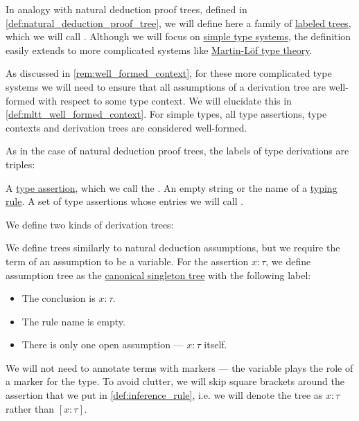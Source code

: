 \begin{definition}\label{def:type_derivation_tree}\mimprovised
  In analogy with natural deduction proof trees, defined in \cref{def:natural_deduction_proof_tree}, we will define here a family of \hyperref[def:labeled_tree]{labeled trees}, which we will call . Although we will focus on \hyperref[def:simple_type_system]{simple type systems}, the definition easily extends to more complicated systems like \hyperref[def:mltt]{Martin-L\"of type theory}.

  As discussed in \cref{rem:well_formed_context}, for these more complicated type systems we will need to ensure that all assumptions of a derivation tree are well-formed with respect to some type context. We will elucidate this in \cref{def:mltt_well_formed_context}. For simple types, all type assertions, type contexts and derivation trees are considered well-formed.

  As in the case of natural deduction proof trees, the labels of type derivations are triples:
  \begin{thmenum}[series=def:type_derivation_tree]
     A \hyperref[def:type_assertion]{type assertion}, which we call the .
     An empty string or the name of a \hyperref[def:simple_typing_rule]{typing rule}.
     A set of type assertions whose entries we will call .
  \end{thmenum}

  We define two kinds of derivation trees:
  \begin{thmenum}[resume=def:type_derivation_tree]
     We define  trees similarly to natural deduction assumptions, but we require the term of an assumption to be a variable. For the assertion \( x: \tau \), we define assumption tree as the \hyperref[def:canonical_singleton_tree]{canonical singleton tree} with the following label:
    \begin{itemize}
      \item The conclusion is \( x: \tau \).
      \item The rule name is empty.
      \item There is only one open assumption --- \( x: \tau \) itself.
    \end{itemize}

    We will not need to annotate terms with markers --- the variable plays the role of a marker for the type. To avoid clutter, we will skip square brackets around the assertion that we put in \cref{def:inference_rule}, i.e. we will denote the tree as \( x: \tau \) rather than \( [x: \tau] \).


\end{thmenum}
\end{definition}
